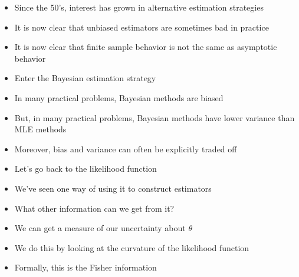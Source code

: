 \documentclass{beamer}
\begin{document}
\frame
{
  \begin{itemize}
    \item{Since the 50's, interest has grown in alternative estimation strategies }
    \item{It is now clear that unbiased estimators are sometimes bad in practice}
    \item{It is now clear that finite sample behavior is not the same as asymptotic behavior}
  \end{itemize}
}

\frame
{
  \begin{itemize}
    \item{Enter the Bayesian estimation strategy}
    \item{In many practical problems, Bayesian methods are biased}
    \item{But, in many practical problems, Bayesian methods have lower variance than MLE methods}
    \item{Moreover, bias and variance can often be explicitly traded off}
  \end{itemize}
}

\frame
{
  \begin{itemize}
    \item{Let's go back to the likelihood function}
    \item{We've seen one way of using it to construct estimators}
    \item{What other information can we get from it?}
  \end{itemize}
}

\frame
{
  \begin{itemize}
    \item{We can get a measure of our uncertainty about $\theta$}
    \item{We do this by looking at the curvature of the likelihood function}
    \item{Formally, this is the Fisher information}
  \end{itemize}
}
\end{document}
